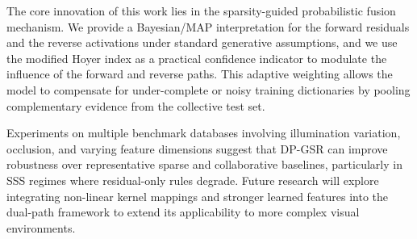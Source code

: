 \documentclass[10pt,comsoc]{IEEEtran}
\begin{document}
The core innovation of this work lies in the sparsity-guided probabilistic fusion mechanism. We provide a Bayesian/MAP interpretation for the forward residuals and the reverse activations under standard generative assumptions, and we use the modified Hoyer index as a practical confidence indicator to modulate the influence of the forward and reverse paths. This adaptive weighting allows the model to compensate for under-complete or noisy training dictionaries by pooling complementary evidence from the collective test set.

Experiments on multiple benchmark databases involving illumination variation, occlusion, and varying feature dimensions suggest that DP-GSR can improve robustness over representative sparse and collaborative baselines, particularly in SSS regimes where residual-only rules degrade. Future research will explore integrating non-linear kernel mappings and stronger learned features into the dual-path framework to extend its applicability to more complex visual environments.
\end{document}

